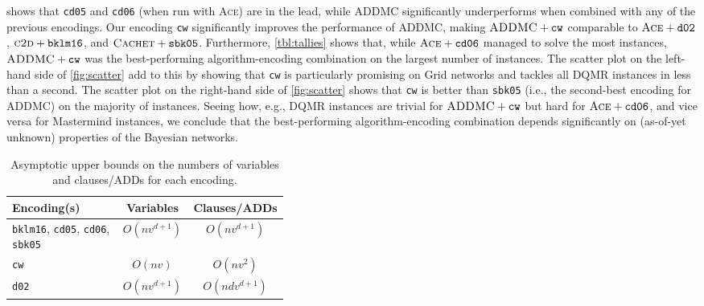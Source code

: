  shows that \texttt{cd05}
\citep{DBLP:conf/ijcai/ChaviraD05} and \texttt{cd06}
\citep{DBLP:conf/sat/ChaviraD06} (when run with \textsc{Ace}) are in the lead,
while \textsc{ADDMC} \citep{DBLP:conf/aaai/DudekPV20} significantly
underperforms when combined with any of the previous encodings. Our encoding
\texttt{cw} significantly improves the performance of \textsc{ADDMC}, making
$\textsc{ADDMC}+\texttt{cw}$ comparable to $\textsc{Ace}+\texttt{d02}$,
$\textsc{c2d}+\texttt{bklm16}$, and $\textsc{Cachet}+\texttt{sbk05}$.
Furthermore, \cref{tbl:tallies} shows that, while $\textsc{Ace}+\texttt{cd06}$
managed to solve the most instances, $\textsc{ADDMC}+\texttt{cw}$ was the
best-performing algorithm-encoding combination on the largest number of
instances. The scatter plot on the left-hand side of \cref{fig:scatter} add to
this by showing that \texttt{cw} is particularly promising on Grid networks and
tackles all DQMR instances in less than a second. The scatter plot on the
right-hand side of \cref{fig:scatter} shows that \texttt{cw} is better than
\texttt{sbk05} \citep{DBLP:conf/aaai/SangBK05} (i.e., the second-best encoding
for \textsc{ADDMC}) on the majority of instances. Seeing how, e.g., DQMR
instances are trivial for $\textsc{ADDMC}+\texttt{cw}$ but hard for
$\textsc{Ace}+\texttt{cd06}$, and vice versa for Mastermind instances, we
conclude that the best-performing algorithm-encoding combination depends
significantly on (as-of-yet unknown) properties of the Bayesian networks.

\begin{table}[t]
  \centering
  \begin{tabular}{m{0.4\linewidth} c c}
    \toprule
    Encoding(s) & Variables & Clauses/ADDs \\
    \midrule
    \texttt{bklm16}, \texttt{cd05}, \texttt{cd06}, \texttt{sbk05} & $O(nv^{d+1})$ & $O(nv^{d+1})$ \\
    \texttt{cw} & $O(nv)$ & $O(nv^2)$ \\
    \texttt{d02} & $O(nv^{d+1})$ & $O(ndv^{d+1})$ \\
    \bottomrule
  \end{tabular}
  \caption{Asymptotic upper bounds on the numbers of variables and clauses/ADDs
    for each encoding.}\label{tbl:asymptotes}
\end{table}

